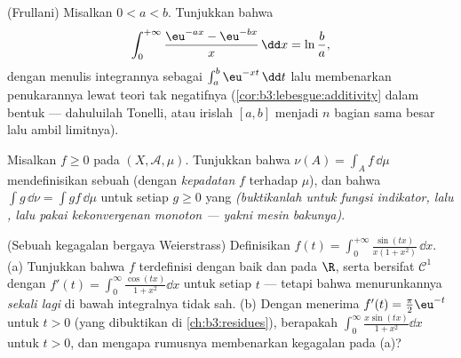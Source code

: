 \begin{exercise}[$\star\star\star$]\label{exo:b3:lebesgue:8}
(Frullani) Misalkan $0 < a < b$. Tunjukkan bahwa
\[
\int_0^{+\infty}\frac{\eu^{-ax} - \eu^{-bx}}{x}\,\dd x =
\ln\frac ba,
\]
dengan menulis integrannya sebagai $\int_a^b \eu^{-xt}\,\dd t$ lalu
membenarkan penukarannya lewat teori tak negatifnya
(\cref{cor:b3:lebesgue:additivity} dalam bentuk  ---
dahuluilah Tonelli, atau irislah $[a,b]$ menjadi $n$ bagian sama besar lalu
ambil limitnya).
\end{exercise}

\begin{exercise}[$\star\star$]\label{exo:b3:lebesgue:9}
Misalkan $f \geq 0$  pada $(X, \mathcal A, \mu)$. Tunjukkan
bahwa $\nu(A) = \int_A f\,\dd\mu$ mendefinisikan sebuah 
(dengan \emph{kepadatan} $f$ terhadap
$\mu$), dan bahwa $\int g\,\dd\nu = \int gf\,\dd\mu$ untuk setiap
$g \geq 0$ yang  \emph{(buktikanlah untuk fungsi indikator, lalu
, lalu pakai kekonvergenan monoton --- yakni mesin bakunya)}.
\end{exercise}

\begin{exercise}[$\star\star\star$]\label{exo:b3:lebesgue:10}
(Sebuah kegagalan bergaya Weierstrass) Definisikan $f(t) =
\int_0^{+\infty}\frac{\sin(tx)}{x(1 + x^2)}\,\dd x$.
(a) Tunjukkan bahwa $f$ terdefinisi dengan baik dan  pada $\R$, serta
bersifat $\mathcal C^1$ dengan $f'(t) = \int_0^\infty\frac{\cos(tx)}{1 +
x^2}\dd x$ untuk setiap $t$ --- tetapi bahwa menurunkannya
\emph{sekali lagi} di bawah integralnya tidak sah.
(b) Dengan menerima $f'(t) = \frac\pi2\eu^{-t}$ untuk $t > 0$ (yang dibuktikan
di \cref{ch:b3:residues}), berapakah
$\int_0^\infty\frac{x\sin(tx)}{1+x^2}\dd x$ untuk $t > 0$, dan
mengapa rumusnya membenarkan kegagalan pada (a)?
\end{exercise}

